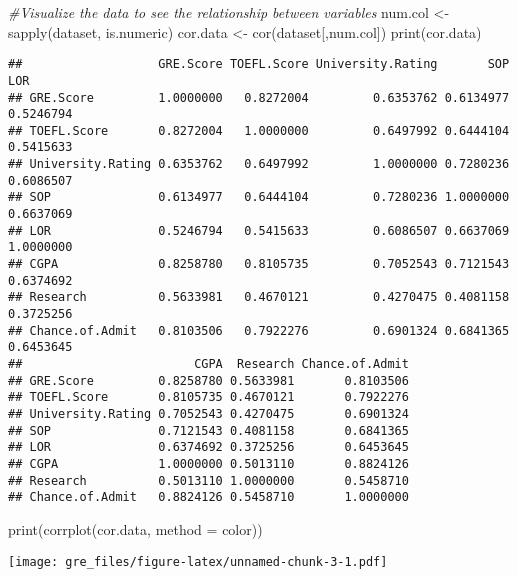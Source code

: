 \documentclass[
]{article}
\newenvironment{Shaded}{\begin{snugshade}}{\end{snugshade}}
\newcommand{\AttributeTok}[1]{\textcolor[rgb]{0.77,0.63,0.00}{#1}}
\newcommand{\CommentTok}[1]{\textcolor[rgb]{0.56,0.35,0.01}{\textit{#1}}}
\newcommand{\FunctionTok}[1]{\textcolor[rgb]{0.00,0.00,0.00}{#1}}
\newcommand{\NormalTok}[1]{#1}
\newcommand{\OtherTok}[1]{\textcolor[rgb]{0.56,0.35,0.01}{#1}}
\newcommand{\StringTok}[1]{\textcolor[rgb]{0.31,0.60,0.02}{#1}}
\begin{document}
\begin{Shaded}
\begin{Highlighting}[]
\CommentTok{\#Visualize the data to see the relationship between variables}
\NormalTok{num.col }\OtherTok{\textless{}{-}} \FunctionTok{sapply}\NormalTok{(dataset, is.numeric)}
\NormalTok{cor.data }\OtherTok{\textless{}{-}} \FunctionTok{cor}\NormalTok{(dataset[,num.col])}
\FunctionTok{print}\NormalTok{(cor.data)}
\end{Highlighting}
\end{Shaded}

\begin{verbatim}
##                   GRE.Score TOEFL.Score University.Rating       SOP       LOR
## GRE.Score         1.0000000   0.8272004         0.6353762 0.6134977 0.5246794
## TOEFL.Score       0.8272004   1.0000000         0.6497992 0.6444104 0.5415633
## University.Rating 0.6353762   0.6497992         1.0000000 0.7280236 0.6086507
## SOP               0.6134977   0.6444104         0.7280236 1.0000000 0.6637069
## LOR               0.5246794   0.5415633         0.6086507 0.6637069 1.0000000
## CGPA              0.8258780   0.8105735         0.7052543 0.7121543 0.6374692
## Research          0.5633981   0.4670121         0.4270475 0.4081158 0.3725256
## Chance.of.Admit   0.8103506   0.7922276         0.6901324 0.6841365 0.6453645
##                        CGPA  Research Chance.of.Admit
## GRE.Score         0.8258780 0.5633981       0.8103506
## TOEFL.Score       0.8105735 0.4670121       0.7922276
## University.Rating 0.7052543 0.4270475       0.6901324
## SOP               0.7121543 0.4081158       0.6841365
## LOR               0.6374692 0.3725256       0.6453645
## CGPA              1.0000000 0.5013110       0.8824126
## Research          0.5013110 1.0000000       0.5458710
## Chance.of.Admit   0.8824126 0.5458710       1.0000000
\end{verbatim}

\begin{Shaded}
\begin{Highlighting}[]
\FunctionTok{print}\NormalTok{(}\FunctionTok{corrplot}\NormalTok{(cor.data, }\AttributeTok{method =} \StringTok{\textquotesingle{}color\textquotesingle{}}\NormalTok{))}
\end{Highlighting}
\end{Shaded}

\texttt{[image: gre\_files/figure-latex/unnamed-chunk-3-1.pdf]}
\end{document}
